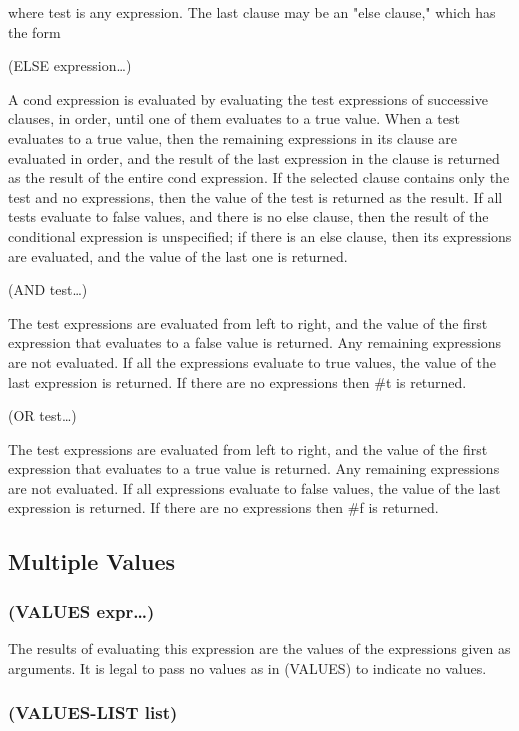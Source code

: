 \documentclass[11pt]{article}
\begin{document}
where test is any expression.  The last clause may be an "else
clause," which has the form

(ELSE expression\ldots{})

A cond expression is evaluated by evaluating the test expressions of
successive clauses, in order, until one of them evaluates to a true
value.  When a test evaluates to a true value, then the remaining
expressions in its clause are evaluated in order, and the result of
the last expression in the clause is returned as the result of the
entire cond expression.  If the selected clause contains only the
test and no expressions, then the value of the test is returned as
the result.  If all tests evaluate to false values, and there is no
else clause, then the result of the conditional expression is
unspecified; if there is an else clause, then its expressions are
evaluated, and the value of the last one is returned.

(AND test\ldots{})

The test expressions are evaluated from left to right, and the value
of the first expression that evaluates to a false value is returned.
Any remaining expressions are not evaluated.  If all the expressions
evaluate to true values, the value of the last expression is
returned.  If there are no expressions then \#t is returned.

(OR test\ldots{})

The test expressions are evaluated from left to right, and the value
of the first expression that evaluates to a true value is returned.
Any remaining expressions are not evaluated.  If all expressions
evaluate to false values, the value of the last expression is
returned.  If there are no expressions then \#f is returned.
\subsection{Multiple Values}
\label{sec-4-4}

\subsubsection{(VALUES expr\ldots{})}
\label{sec-4-4-1}

The results of evaluating this expression are the values of the
expressions given as arguments.  It is legal to pass no values as in
(VALUES) to indicate no values.
\subsubsection{(VALUES-LIST list)}
\label{sec-4-4-2}
\end{document}
